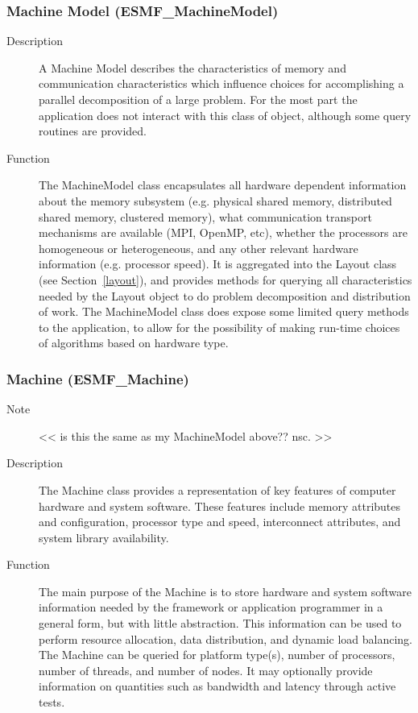 \subsubsection{Machine Model (ESMF\_MachineModel)}
\label{sec:machinemodel} 
\begin{description}
\item [Description] A Machine Model describes the characteristics of memory and
communication characteristics which influence choices for accomplishing a parallel 
decomposition of a large problem.  For the most part the application does not
interact with this class of object, although some query routines are provided.
\item [Function] The MachineModel class encapsulates all hardware dependent information
about the memory subsystem (e.g. physical shared memory, distributed shared memory, clustered
memory), what communication transport mechanisms are available (MPI, OpenMP, etc), 
whether the processors are homogeneous or heterogeneous, and 
any other relevant hardware information (e.g. processor speed).
It is aggregated into the Layout class (see Section~\ref{layout}), and provides
methods for querying all characteristics needed by the Layout object to do 
problem decomposition and distribution of work.
The MachineModel class does expose some limited query methods to the application, 
to allow for the possibility of making run-time choices of algorithms based on hardware type.
\end{description}

\subsubsection{Machine (ESMF\_Machine)} 
\begin{description}
\item [Note] << is this the same as my MachineModel above??  nsc. >>
\item [Description] The Machine class provides a representation of 
key features of computer hardware and system software.  These
features include memory attributes and configuration, processor type and speed,
interconnect attributes, and system library availability.
\item [Function]
The main purpose of the Machine is to store hardware and system software
information needed by the framework or application programmer in a general
form, but with little abstraction.  This information can be used to perform resource 
allocation, data distribution, and dynamic load balancing.  The Machine can be queried
for platform type(s), number of processors, number of threads, and number of 
nodes.  It may optionally provide information on quantities such as bandwidth and 
latency through active tests.  
\end{description}

